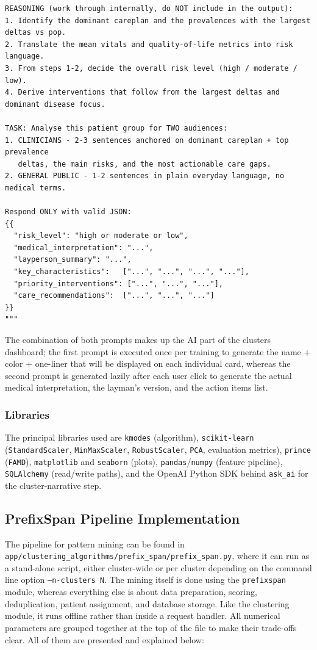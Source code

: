 \begin{lstlisting}[style=pythonstyle]
REASONING (work through internally, do NOT include in the output):
1. Identify the dominant careplan and the prevalences with the largest deltas vs pop.
2. Translate the mean vitals and quality-of-life metrics into risk language.
3. From steps 1-2, decide the overall risk level (high / moderate / low).
4. Derive interventions that follow from the largest deltas and dominant disease focus.

TASK: Analyse this patient group for TWO audiences:
1. CLINICIANS - 2-3 sentences anchored on dominant careplan + top prevalence
   deltas, the main risks, and the most actionable care gaps.
2. GENERAL PUBLIC - 1-2 sentences in plain everyday language, no medical terms.

Respond ONLY with valid JSON:
{{
  "risk_level": "high or moderate or low",
  "medical_interpretation": "...",
  "layperson_summary": "...",
  "key_characteristics":   ["...", "...", "...", "..."],
  "priority_interventions": ["...", "...", "..."],
  "care_recommendations":  ["...", "...", "..."]
}}
"""
\end{lstlisting}

\noindent The combination of both prompts makes up the AI part of the clusters dashboard; the first prompt is executed once per training to generate the name + color + one-liner that will be displayed on each individual card, whereas the second prompt is generated lazily after each user click to generate the actual medical interpretation, the layman’s version, and the action items list.

\subsubsection*{Libraries}

The principal libraries used are \texttt{kmodes} (algorithm), \texttt{scikit-learn} (\texttt{StandardScaler}, \texttt{MinMaxScaler}, \texttt{RobustScaler}, \texttt{PCA}, evaluation metrics), \texttt{prince} (\texttt{FAMD}), \texttt{matplotlib} and \texttt{seaborn} (plots), \texttt{pandas}/\texttt{numpy} (feature pipeline), \texttt{SQLAlchemy} (read/write paths), and the OpenAI Python SDK behind \texttt{ask\_ai} for the cluster-narrative step.

\subsection{PrefixSpan Pipeline Implementation}

The pipeline for pattern mining can be found in \texttt{app/\allowbreak clustering\_\allowbreak algorithms/\allowbreak prefix\_\allowbreak span/\allowbreak prefix\_\allowbreak span.py}, where it can run as a stand-alone script, either cluster-wide or per cluster depending on the command line option \texttt{--n-clusters N}. The mining itself is done using the \texttt{prefixspan} module, whereas everything else is about data preparation, scoring, deduplication, patient assignment, and database storage. Like the clustering module, it runs offline rather than inside a request handler. All numerical parameters are grouped together at the top of the file to make their trade-offs clear. All of them are presented and explained below:

